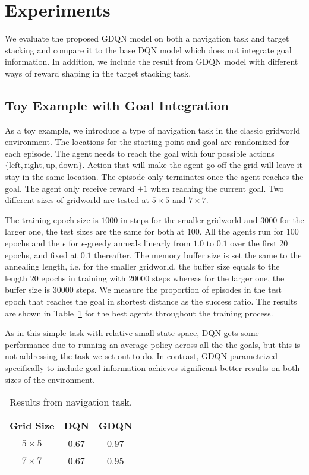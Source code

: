 \section{Experiments}
We evaluate the proposed GDQN model on both a navigation task and target stacking and compare it to the base DQN model which does not integrate goal information. In addition, we include the result from GDQN model with different ways of reward shaping in the target stacking task.

\subsection{Toy Example with Goal  Integration}
As a toy example, we introduce a type of navigation task in the classic gridworld environment. The locations for the starting point and goal are randomized for each episode. The agent needs to reach the goal with four possible actions $\{\text{left},\text{right},\text{up},\text{down}\}$. Action that will make the agent go off the grid will leave it stay in the same location. The episode only terminates once the agent reaches the goal. The agent only receive reward $+1$ when reaching the current goal. Two different sizes of gridworld are tested at $5\times5$ and $7\times7$. 

The training epoch size is $1000$ in steps for the smaller gridworld and $3000$ for the larger one, the test sizes are the same for both at $100$. All the agents run for $100$ epochs and the $\epsilon$ for $\epsilon$-greedy anneals linearly from $1.0$ to $0.1$ over the first $20$ epochs, and fixed at $0.1$ thereafter. The memory buffer size is set the same to the annealing length, i.e. for the smaller gridworld, the buffer size equals to the length $20$ epochs in training with $20000$ steps whereas for the larger one, the buffer size is $30000$ steps.
We measure the proportion of episodes in the test epoch that reaches the goal in shortest distance as the success ratio. The results are shown in Table~\ref{tab:gridworld_result} for the best agents throughout the training process.

As in this simple task with relative small state space, DQN gets some performance due to running an average policy across all the the goals, but this is not addressing the task we set out to do. In contrast, GDQN parametrized specifically to include goal information achieves significant better results on both sizes of the environment.

\begin{table}
\centering
\begin{tabular}{c|cc}
\toprule
Grid Size & DQN  & GDQN \\ 
\midrule
$5\times 5$       & 0.67 & 0.97 \\
$7\times 7$       & 0.67 & 0.95 \\
\bottomrule
\end{tabular}
\caption{Results from navigation task.}
\label{tab:gridworld_result}
\end{table}

